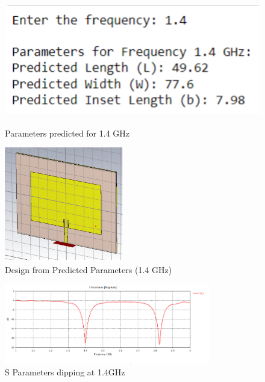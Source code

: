 \documentclass[a4paper,12pt]{report}
\begin{document}
\begin{figure}[H]
    \centering
    \begin{minipage}{0.48\textwidth}
        \centering
        \includegraphics[width=\textwidth,height =5cm]{data14.png}
        \caption{Parameters predicted for 1.4 GHz}
        \label{fig:4ghz_inset1}
    \end{minipage}
    \hfill %
    \begin{minipage}{0.48\textwidth}
        \centering
        \includegraphics[width=\textwidth,height =5cm]{pred14img.png}
        \caption{Design from Predicted Parameters (1.4 GHz)}
        \label{fig:4ghz_inset2}
    \end{minipage}
\end{figure}
\begin{figure}[H]
    \centering
    \includegraphics[width=0.8\textwidth]{pred14.png}
    \caption{S Parameters dipping at 1.4GHz}
    \label{fig:width_calculator}
\end{figure}
\end{document}
